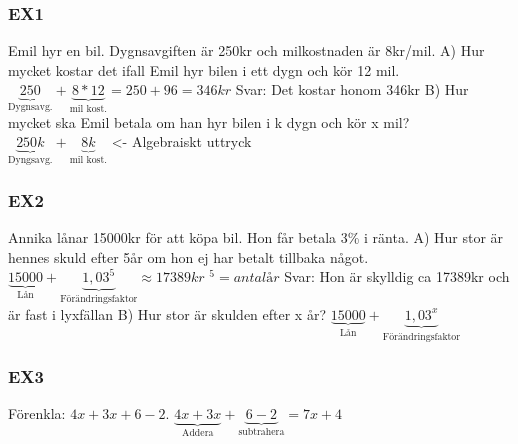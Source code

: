 \documentclass[a4paper,10pt]{article}
\begin{document}
\begin{flushleft}
    \subsubsection{EX1}
      Emil hyr en bil. Dygnsavgiften är 250kr och milkostnaden är 8kr/mil.\newline
      A) Hur mycket kostar det ifall Emil hyr bilen i ett dygn och kör 12 mil.\newline
      $ \underbrace{250}_{\text{Dygnsavg.}} + \underbrace{8*12}_{\text{mil kost.}} = 250+96 = 346kr $
      Svar: Det kostar honom 346kr \newline\newline
      B) Hur mycket ska Emil betala om han hyr bilen i k dygn och kör x mil?\newline\newline
      $ \underbrace{250k}_{\text{Dyngsavg.}} + \underbrace{8k}_{\text{mil kost.}}$ <- Algebraiskt uttryck\newline\newline


    \subsubsection{EX2}
      Annika lånar 15000kr för att köpa bil. Hon får betala 3\% i ränta.\newline
      A) Hur stor är hennes skuld efter 5år om hon ej har betalt tillbaka något.\newline
      $ \underbrace{15000}_{\text{Lån}} + \underbrace{1,03^5}_{\text{Förändringsfaktor}} \approx 17389kr $ \newline
      \textit{$^5 = antal år$} \newline
      Svar: Hon är skylldig ca 17389kr och är fast i lyxfällan \newline\newline
      B) Hur stor är skulden efter x år?\newline\newline
      $ \underbrace{15000}_{\text{Lån}} + \underbrace{1,03^x}_{\text{Förändringsfaktor}} $\newline\newline

    \subsubsection{EX3}
      Förenkla: $4x+3x+6-2$.\newline\newline
      $ \underbrace{4x+3x}_{\text{Addera}} + \underbrace{6-2}_{\text{subtrahera}} = 7x+4 $ \newline\newline


\end{flushleft}
\end{document}
